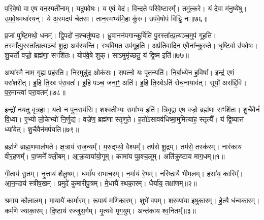प॒रि॒वे॒षो वा ए॒ष वन॒स्पती॑नाम्।
यदु॑पवे॒षः।
य ए॒वं वेद॑।
वि॒न्दते॑ परिवे॒ष्टारम्᳚।
तमु॑त्क॒रे।
यं दे॒वा म॑नु॒ष्ये॑षु।
उ॒प॒वे॒षमधा॑रयन्।
ये अ॒स्मदप॑ चेतसः।
तान॒स्मभ्य॑मि॒हा कु॑रु।
उप॑वे॒षोप॑ विड्ढि नः॥७६॥

प्र॒जां पुष्टि॒मथो॒ धनम्᳚।
द्वि॒पदो॑ न॒श्चतु॑ष्पदः।
ध्रु॒वानन॑प\-गान्कु॒र्विति॑ पु॒रस्ता᳚त्प्र॒त्यञ्च॒मुप॑ गूहति।
तस्मा᳚त्पु॒र\-स्ता᳚त्प्र॒त्यञ्चः॑ शू॒द्रा अव॑स्यन्ति।
स्थ॒वि॒म॒त उप॑गूहति।
अप्र॑तिवादिन ए॒वैना᳚न्कुरुते।
धृष्टि॒र्वा उ॑पवे॒षः।
शु॒चर्तो वज्रो॒ ब्रह्म॑णा॒ सꣳशि॑तः।
योप॑वे॒षे शुक्।
साऽमुमृ॑च्छतु॒ यं द्वि॒ष्म इति॑॥७७॥

अथा᳚स्मै नाम॒ गृह्य॒ प्रह॑रति।
निर॒मुन्नु॑द॒ ओक॑सः।
स॒पत्नो॒ यः पृ॑त॒न्यति॑।
नि॒र्बा॒ध्ये॑न ह॒विषा᳚।
इन्द्र॑ एणं॒ परा॑शरीत्।
इ॒हि ति॒स्रः प॑रा॒वतः॑।
इ॒हि पञ्च॒ जना॒ꣳ॒ अति॑।
इ॒हि ति॒स्रोऽति॑ रोच॒नायाव॑त्।
सूर्यो॒ अस॑द्दि॒वि।
प॒र॒मान्त्वा॑ परा॒वतम्᳚॥७८॥

इन्द्रो॑ नयतु वृत्र॒हा।
यतो॒ न पुन॒राय॑सि।
श॒श्व॒तीभ्यः॒ समा᳚भ्य॒ इति॑।
त्रि॒वृद्वा ए॒ष वज्रो॒ ब्रह्म॑णा॒ सꣳशि॑तः।
शु॒चैवैनं॑ वि॒ध्वा।
ए॒भ्यो लो॒केभ्यो॑ नि॒र्णुद्य॑।
वज्रे॑ण॒ ब्रह्म॑णा स्तृणुते।
ह॒तो॑\-ऽसावव॑धिष्मा॒मुमित्या॑ह॒ स्तृत्यै᳚।
यं द्वि॒ष्यात्तं ध्या॑येत्।
शु॒चैवैन॑मर्पयति॥७९॥




\clearpage
{}
\setcounter{anuvakam}{0}

ब्रह्म॑णे ब्राह्म॒णमाल॑भते।
क्ष॒त्राय॑ राज॒न्यम्᳚।
म॒रुद्भ्यो॒ वैश्यम्᳚।
तप॑से शू॒द्रम्।
तम॑से॒ तस्क॑रम्।
नार॑काय वीर॒हणम्᳚।
पा॒प्मने᳚ क्ली॒बम्।
आ॒क्र॒याया॑यो॒गूम्।
कामा॑य पुꣴश्च॒लूम्।
अति॑क्रुष्टाय माग॒धम्॥१॥

गी॒ताय॑ सू॒तम्।
नृ॒त्ताय॑ शैलू॒षम्।
धर्मा॑य सभाच॒रम्।
न॒र्माय॑ रे॒भम्।
नरि॑ष्ठायै भीम॒लम्।
हसा॑य॒ कारिम्᳚।
आ॒न॒न्दाय॑ स्त्रीष॒खम्।
प्रमुदे॑ कुमारीपु॒त्रम्।
मे॒धायै॑ रथका॒रम्।
धैर्या॑य॒ तक्षा॑णम्॥२॥

श्रमा॑य कौला॒लम्।
मा॒यायै॑ कार्मा॒रम्।
रू॒पाय॑ मणिका॒रम्।
शुभे॑ व॒पम्।
श॒र॒व्या॑या इषुका॒रम्।
हे॒त्यै ध॑न्वका॒रम्।
कर्म॑णे ज्या\-का॒रम्।
दि॒ष्टाय॑ रज्जुस॒र्गम्।
मृ॒त्यवे॑ मृग॒युम्।
अन्त॑काय श्व॒नितम्᳚॥३॥

